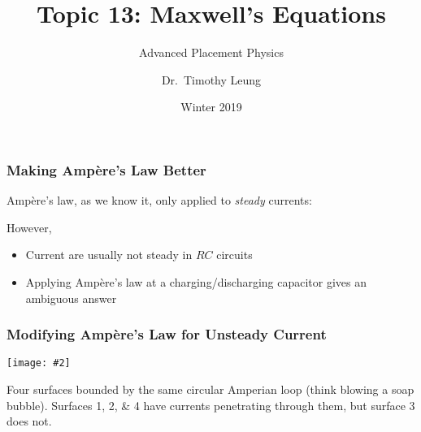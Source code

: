 \documentclass[12pt,aspectratio=169]{beamer}
\title{Topic 13: Maxwell's Equations}
\subtitle{Advanced Placement Physics}
\author[TML]{Dr.\ Timothy Leung}
\institute{Olympiads School}
\date{Winter 2019}
\newcommand{\pic}[2]{\texttt{[image: \#2]}}\newcommand{\mb}[1]{\mathbf{#1}}
\newcommand{\eq}[2]{\vspace{#1}{\Large\begin{displaymath}#2\end{displaymath}}}
\begin{document}
\begin{frame}
  \maketitle
\end{frame}



%


\begin{frame}
  \frametitle{Making Amp\`{e}re's Law Better}

  Amp\`{e}re's law, as we know it, only applied to \emph{steady} currents:

  \eq{-.1in}{
    \oint_C \mb{B}\cdot d\boldsymbol{\ell}=\mu_0 I_c
  }
  However,
  \begin{itemize}
  \item Current are usually not steady in $RC$ circuits
  \item Applying Amp\`{e}re's law at a charging/discharging capacitor gives an
    ambiguous answer
  \end{itemize}
\end{frame}

\begin{frame}
  \frametitle{Modifying Amp\`{e}re's Law for Unsteady Current}

  \begin{center}
    \pic{.3}{mag_displacement_fig3.jpg}
  \end{center}

  \vspace{-.15in}Four surfaces bounded by the same circular Amperian loop
  (think blowing a soap bubble). Surfaces \numlist{1;2;4} have currents
  penetrating through them, but surface \num{3} does not.
\end{frame}
\end{document}
